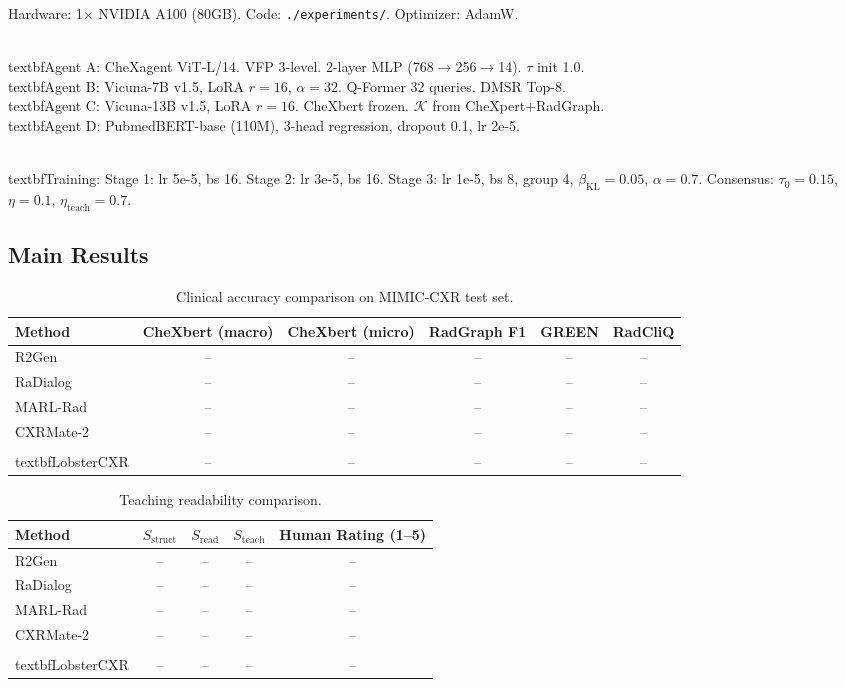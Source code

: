 \documentclass[runningheads,10pt]{llncs}
\newcommand{\Sstruct}{S_{\text{struct}}}
\newcommand{\Sread}{S_{\text{read}}}
\newcommand{\Steach}{S_{\text{teach}}}
\begin{document}
Hardware: 1$\times$ NVIDIA A100 (80GB). Code: \texttt{./experiments/}. Optimizer: AdamW.

\noindent\\textbf{Agent A:} CheXagent ViT-L/14. VFP 3-level. 2-layer MLP (768$\to$256$\to$14). $\tau$ init 1.0.
\\textbf{Agent B:} Vicuna-7B v1.5, LoRA $r=16$, $\alpha=32$. Q-Former 32 queries. DMSR Top-8.
\\textbf{Agent C:} Vicuna-13B v1.5, LoRA $r=16$. CheXbert frozen. $\mathcal{K}$ from CheXpert+RadGraph.
\\textbf{Agent D:} PubmedBERT-base (110M), 3-head regression, dropout 0.1, lr 2e-5.

\noindent\\textbf{Training:} Stage 1: lr 5e-5, bs 16. Stage 2: lr 3e-5, bs 16. Stage 3: lr 1e-5, bs 8, group 4, $\beta_{\text{KL}}=0.05$, $\alpha=0.7$. Consensus: $\tau_0=0.15$, $\eta=0.1$, $\eta_{\text{teach}}=0.7$.

\subsection{Main Results}

\begin{table}[t]
\centering
\caption{Clinical accuracy comparison on MIMIC-CXR test set.}
\label{tab:main}
\small
\begin{tabular}{lCCCCC}
\toprule
Method & CheXbert (macro) & CheXbert (micro) & RadGraph F1 & GREEN & RadCliQ \\
\midrule
R2Gen~\cite{r2gen} & -- & -- & -- & -- & -- \\
RaDialog~\cite{radialog} & -- & -- & -- & -- & -- \\
MARL-Rad~\cite{marlrad} & -- & -- & -- & -- & -- \\
CXRMate-2~\cite{cxrmate2} & -- & -- & -- & -- & -- \\
\midrule
\\textbf{LobsterCXR} & -- & -- & -- & -- & -- \\
\bottomrule
\end{tabular}
\end{table}

\begin{table}[t]
\centering
\caption{Teaching readability comparison.}
\label{tab:teach}
\small
\begin{tabular}{lCCCC}
\toprule
Method & $\Sstruct$ & $\Sread$ & $\Steach$ & Human Rating (1--5) \\
\midrule
R2Gen & -- & -- & -- & -- \\
RaDialog & -- & -- & -- & -- \\
MARL-Rad & -- & -- & -- & -- \\
CXRMate-2 & -- & -- & -- & -- \\
\midrule
\\textbf{LobsterCXR} & -- & -- & -- & -- \\
\bottomrule
\end{tabular}
\end{table}
\end{document}
